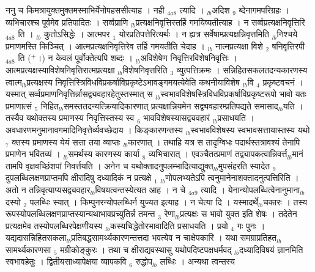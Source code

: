 \documentclass[article,12pt,a4paper]{memoir}%
\newcommand{\add}[1]{($^{+}$#1)}
\begin{document}
	  
	  \pstart \leavevmode%
	\hphantom{.}ननु च किमत्रायुक्तमुक्तमस्माभिर्येनोपहससीत्याह । {\color{DodgerBlue3}नही} {\tiny $_{4a8}$} त्यादि । {\tiny $_{lb}$}अदिश {\tiny $_{9}$} \leavevmode{} ब्देनागमपरिग्रहः । व्यभिचारश्च पूर्वमेव प्रतिपादितः । सर्व्वप्राणि {\tiny $_{lb}$}प्रत्यक्षनिवृत्तिस्तर्हि गमयिष्यतीत्याह । {\color{DodgerBlue3}न सर्व्वप्रत्यक्षनिवृत्तिरि} {\tiny $_{4a8}$} ति । {\tiny $_{lb}$} \leavevmode{} कुतोऽसिद्धेः । आत्मपर {\tiny $_{1}$} योरप्रतिपत्तेरित्यर्थः । न ह्यत्र सर्वेषाम्प्रत्यक्षन्निवृत्तमिति {\tiny $_{lb}$}निश्चये प्रमाणमस्ति किञ्चित् । आत्मप्रत्यक्षनिवृत्तिरेव तर्हि गमयतीति चेदाह । {\tiny $_{lb}$} {\color{DodgerBlue3}नात्मप्रत्यक्षा विशे {\tiny $_{2}$} षनिवृत्तिरपी} {\tiny $_{4a8}$} ति \add{।} न केवलं पूर्वोक्तेत्यपि शब्दः । {\tiny $_{lb}$}अविशेषेण निवृत्तिरविशेषनिवृत्तिः । आत्मप्रत्यक्षस्याविशेषनिवृत्तिरात्मप्रत्यक्षा {\tiny $_{lb}$}विशेषनिवृत्तरिति {\tiny $_{3}$} व्युत्पत्तिक्रमः । सन्निहितसकलतदन्यकारणस्य त्वात्म{\tiny $_{lb}$}प्रत्यक्षस्य निवृत्तिस्त्रिविधविप्रकर्षाविप्रकृष्टेऽभावङ्गमयत्येवेति कथनीयाविशेष {\tiny $_{lb}$}वि {\tiny $_{4}$} प्रकृष्टवचनं । यस्मात् सर्व्वप्रमाणनिवृत्तिर्न्नासद्व्यवहारहेतुस्तस्मात् स {\tiny $_{lb}$}स्वभावविशेषस्त्रिविधविप्रकर्षाविप्रकृष्टरूपो भावो यतः प्रमाणात्सं {\tiny $_{5}$} निहित{\tiny $_{lb}$}समस्ततदन्यत्क्रियादिकारणात् प्रत्यक्षान्नियमेन सद्व्यवहारम्प्रतिपद्यते समासाद{\tiny $_{lb}$}यति । तस्यैव यथोक्तस्य प्रमाणस्य निवृत्तिस्तस्य स्व {\tiny $_{6}$} भावविशेषस्यासद्व्यवहारं {\tiny $_{lb}$}प्रसाधयति । अवधारणमनुमानावगमादिनिवृत्तेर्व्यवच्छेदाय । किङ्कारणन्तस्य {\tiny $_{lb}$}स्वभावविशेषस्य स्वभावसत्तायास्तस्य यथो {\tiny $_{7}$} क्तस्य प्रमाणस्य येयं सत्ता तया व्याप्तः {\tiny $_{lb}$}कारणात् । तथाहि यत्र स तादृग्विधः पदार्थस्तत्रावश्यं तेनापि प्रमाणेन भवितव्यं । {\tiny $_{lb}$}समर्थस्य कारणस्य कार्या {\tiny $_{8}$} व्यभिचारात् । एवञ्चैतत्प्रमाणं तद्व्यापकत्वान्निवर्त्त{\tiny $_{lb}$}मानं तामपि वृक्षवच्छिंशपां निवर्त्तयति । अनेन च यथोक्तादनुपलम्भादित्याद्युक्त{\tiny $_{lb}$}मुपसंहरति स्यादेत {\tiny $_{9}$} \leavevmode{} दुपलब्धिलक्षणप्राप्तमपि क्षीरादिषु दध्यादिकं न प्रत्यक्षे {\tiny $_{1}$} {\tiny $_{lb}$}णोपलभ्यतेऽपि त्वनुमानेनाशक्तादनुत्पत्तिरिति । अतो न तन्निवृत्याप्यसद्व्यवहार{\tiny $_{lb}$}विषयत्वन्तस्येत्यत आह । {\color{DodgerBlue3}न चे} {\tiny $_{4a9}$} त्यादि । येनान्योपलब्धित्वेनानुमाना{\tiny $_{lb}$}दस्यो {\tiny $_{2}$} पलब्धिः स्यात् । किम्पुनरन्योपलब्धिर्न युज्यत इत्याह । {\color{DodgerBlue3}न चेत्या} दि । यस्मादर्थे{\tiny $_{lb}$}चकारः । तस्य रूपस्योपलब्धिलक्षणप्राप्तस्यान्यथाभावप्रच्युतिर्न्न तमन्त {\tiny $_{3}$} रेणा{\tiny $_{lb}$}प्रत्यक्षः स भावो युक्त इति शेषः । तदेतेन प्रत्यक्षमेव तस्योपलब्धिरपेक्षणीयस्य {\tiny $_{lb}$}कस्यचिद्धेतोरभावादिति प्रसाधयति । प्रयो {\tiny $_{4}$} गः पुनः । यद्यदासन्निहितसकला{\tiny $_{lb}$}प्रतिबद्धसामर्थ्यकारणन्तत्तदा भवत्येव न चाक्षेपकारि । यथा समग्राप्रतिहत{\tiny $_{lb}$}सामर्थ्यकारणसा {\tiny $_{5}$} मग्रीकोङ्कुरः । तथा च क्षीराद्यवस्थासु यथोपदिष्टपक्षधर्मवद् {\tiny $_{lb}$}दध्यादिविषयं ज्ञानमिति स्वभावहेतुः । द्वितीयसाध्यापेक्षया व्यापकवि {\tiny $_{6}$} रुद्धोप{\tiny $_{lb}$} \leavevmode{} लब्धिः । अन्यथा त्वन्तस्य 
\end{document}
